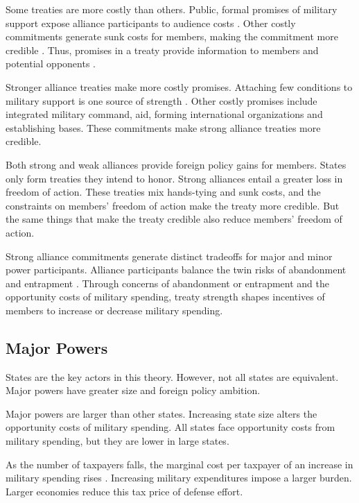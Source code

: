 \documentclass[12pt]{article}
\begin{document}
Some treaties are more costly than others. 
Public, formal promises of military support expose alliance participants to audience costs \citep{Morrow2000}.
Other costly commitments generate sunk costs for members, making the commitment more credible \citep{Morrow2000}.
Thus, promises in a treaty provide information to members and potential opponents \citep{Leeds2003}.


Stronger alliance treaties make more costly promises. 
Attaching few conditions to military support is one source of strength \citep{Benson2012}.
Other costly promises include integrated military command, aid, forming international organizations and establishing bases. 
These commitments make strong alliance treaties more credible.


Both strong and weak alliances provide foreign policy gains for members. 
States only form treaties they intend to honor. 
Strong alliances entail a greater loss in freedom of action. 
These treaties mix hands-tying and sunk costs, and the constraints on members' freedom of action make the treaty more credible.
But the same things that make the treaty credible also reduce members' freedom of action.  


Strong alliance commitments generate distinct tradeoffs for major and minor power participants. 
Alliance participants balance the twin risks of abandonment and entrapment \citep{Snyder1997, Benson2012}. 
Through concerns of abandonment or entrapment and the opportunity costs of military spending, treaty strength shapes incentives of members to increase or decrease military spending.



\subsection{Major Powers}

States are the key actors in this theory. 
However, not all states are equivalent.
Major powers have greater size and foreign policy ambition. 


Major powers are larger than other states. 
Increasing state size alters the opportunity costs of military spending.  
All states face opportunity costs from military spending, but they are lower in large states.  


As the number of taxpayers falls, the marginal cost per taxpayer of an increase in military spending rises \citep{DudleyMontmarquette1981}. 
Increasing military expenditures impose a larger burden.
Larger economies reduce this tax price of defense effort. 
\end{document}
